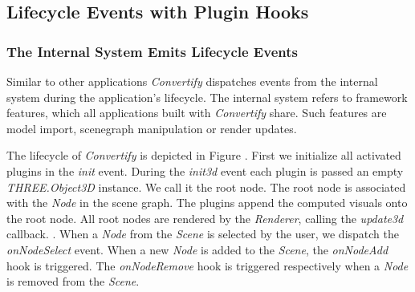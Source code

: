 \documentclass[../ClassicThesis.tex]{subfiles}
\begin{document}

\subsection{Lifecycle Events with Plugin Hooks}

\subsubsection{The Internal System Emits Lifecycle Events}

Similar to other applications \emph{Convertify}
dispatches events from the internal system during the application's lifecycle.
The internal system refers to framework features, which all applications built
with \emph{Convertify} share. Such features are model import, scenegraph
manipulation or render updates.


The lifecycle of \emph{Convertify} is depicted in Figure . First we initialize all activated plugins in the
\emph{init} event. During the \emph{init3d} event each plugin is passed an empty
\emph{THREE.Object3D} instance. We call it the root node. The root node is
associated with the \emph{Node} in the scene graph. The plugins append
the computed visuals onto the root node. All root nodes are rendered by the
\emph{Renderer}, calling the \emph{update3d} callback. . When a \emph{Node} from the \emph{Scene} is selected by the user, we
dispatch the \emph{onNodeSelect} event. When a new \emph{Node} is added to the
\emph{Scene}, the \emph{onNodeAdd} hook is triggered. The \emph{onNodeRemove}
hook is triggered respectively when a \emph{Node} is removed from the
\emph{Scene}. 
\end{document}
